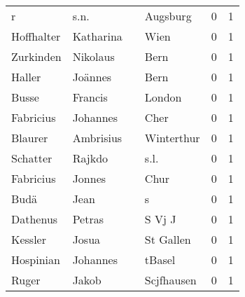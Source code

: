 \begin{center}
\begin{tiny}
\begin{longtabu}{llllrr}
                        r &                               s.n. &             &                                    Augsburg &          0 &         1 \\
               Hoffhalter &                          Katharina &             &                                        Wien &          0 &         1 \\
                Zurkinden &                           Nikolaus &             &                                        Bern &          0 &         1 \\
                   Haller &                            Joännes &             &                                        Bern &          0 &         1 \\
                    Busse &                            Francis &             &                                      London &          0 &         1 \\
                Fabricius &                           Johannes &             &                                        Cher &          0 &         1 \\
                  Blaurer &                          Ambrisius &             &                                  Winterthur &          0 &         1 \\
                 Schatter &                             Rajkdo &             &                                        s.l. &          0 &         1 \\
                Fabricius &                             Jonnes &             &                                        Chur &          0 &         1 \\
                     Budä &                               Jean &             &                                           s &          0 &         1 \\
                 Dathenus &                             Petras &             &                                      S Vj J &          0 &         1 \\
                  Kessler &                              Josua &             &                                   St Gallen &          0 &         1 \\
                Hospinian &                           Johannes &             &                                      tBasel &          0 &         1 \\
                    Ruger &                              Jakob &             &                                  Scjfhausen &          0 &         1 \\

\end{longtabu}
\end{tiny}
\end{center}
